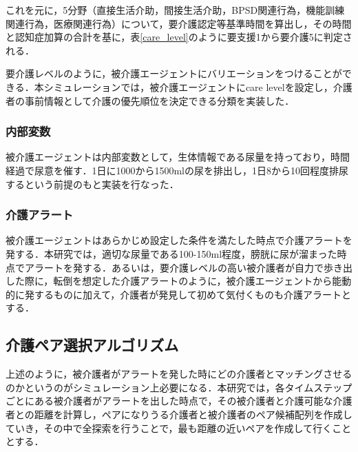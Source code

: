 これを元に，5分野（直接生活介助，間接生活介助，BPSD関連行為，機能訓練関連行為，医療関連行為）について，要介護認定等基準時間を算出し，その時間と認知症加算の合計を基に，表\ref{care_level}のように要支援1から要介護5に判定される．

\begin{table}[htb]
  \caption[要介護の分類]{要介護の分類}
  \label{care_level}
  \centering
\end{table}

要介護レベルのように，被介護エージェントにバリエーションをつけることができる．本シミュレーションでは，被介護エージェントにcare levelを設定し，介護者の事前情報として介護の優先順位を決定できる分類を実装した．

\subsubsection{内部変数}
被介護エージェントは内部変数として，生体情報である尿量を持っており，時間経過で尿意を催す．1日に1000から1500mlの尿を排出し，1日8から10回程度排尿するという前提のもと実装を行なった．

\subsubsection{介護アラート}

被介護エージェントはあらかじめ設定した条件を満たした時点で介護アラートを発する．本研究では，適切な尿量である100-150ml程度，膀胱に尿が溜まった時点でアラートを発する．あるいは，要介護レベルの高い被介護者が自力で歩き出した際に，転倒を想定した介護アラートのように，被介護エージェントから能動的に発するものに加えて，介護者が発見して初めて気付くものも介護アラートとする．

\subsection{介護ペア選択アルゴリズム}

上述のように，被介護者がアラートを発した時にどの介護者とマッチングさせるのかというのがシミュレーション上必要になる．本研究では，各タイムステップごとにある被介護者がアラートを出した時点で，その被介護者と介護可能な介護者との距離を計算し，ペアになりうる介護者と被介護者のペア候補配列を作成していき，その中で全探索を行うことで，最も距離の近いペアを作成して行くこととする．
